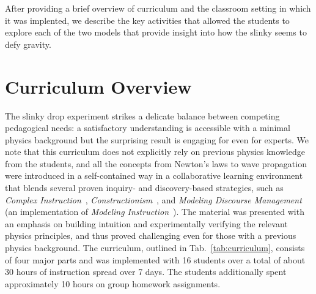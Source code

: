 \documentclass[pre,preprint,superscriptaddress,longbibliography]{revtex4-1}
\begin{document}
After providing a brief overview of curriculum and the classroom setting in which it was implented, we describe the key activities that allowed the students to explore each of the two models that provide insight into how the slinky seems to defy gravity.   

\section{Curriculum Overview}

 

%
%


The slinky drop experiment strikes a delicate balance between competing pedagogical needs: a satisfactory understanding is accessible with a  minimal physics background but the surprising result is engaging for even for experts. 
We note that this curriculum does not explicitly rely on previous physics knowledge from the students, and all the concepts from Newton's laws to wave propagation were introduced in a self-contained way in a collaborative learning environment that blends several proven inquiry- and discovery-based strategies, such as \emph{Complex Instruction}~\cite{Cohen1997}, \emph{Constructionism}~\cite{Papert1991}, and \emph{Modeling Discourse Management}~\cite{Desbien2002} (an implementation of \emph{Modeling Instruction}~\cite{Brewe2008}).   The material was presented with an emphasis on building intuition and experimentally verifying the relevant physics principles, and thus proved challenging even for those with a previous physics background.  The curriculum, outlined in Tab.~\ref{tab:curriculum}, consists of four major parts and was implemented with 16 students over a total of about 30 hours of instruction spread over 7 days. The students additionally spent approximately 10 hours on group homework assignments. 
\end{document}
